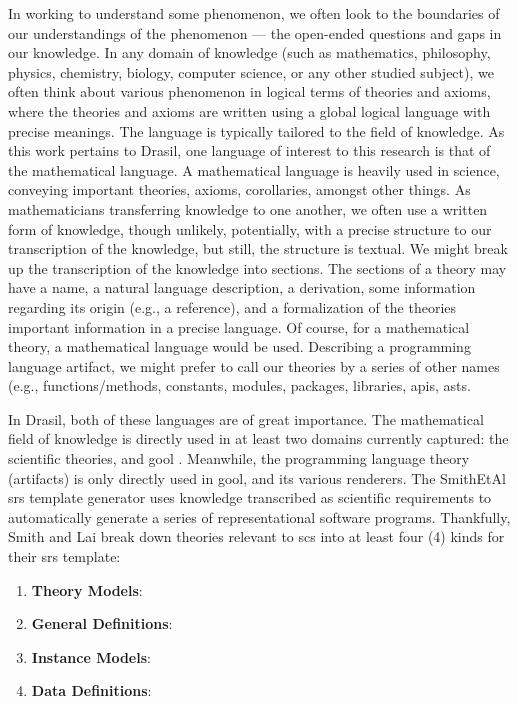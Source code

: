 
In working to understand some phenomenon, we often look to the boundaries of our
understandings of the phenomenon — the open-ended questions and gaps in our
knowledge. In any domain of knowledge (such as mathematics, philosophy, physics,
chemistry, biology, computer science, or any other studied subject), we often
think about various phenomenon in logical terms of theories and axioms, where
the theories and axioms are written using a global logical language with precise
meanings. The language is
typically tailored to the field of knowledge. As this work pertains to Drasil,
one language of interest to this research is that of the mathematical language.
A mathematical language is heavily used in science, conveying important
theories, axioms, corollaries, amongst other things. As mathematicians
transferring knowledge to one another, we often use a written form of knowledge,
though unlikely, potentially, with a precise structure to our transcription of
the knowledge, but still, the structure is textual. We might break up the
transcription of the knowledge into sections. The sections of a theory may have
a name, a natural language description, a derivation, some information regarding
its origin (e.g., a reference), and a formalization of the theories important
information in a precise language. Of course, for a mathematical theory, a
mathematical language would be used. Describing a programming language artifact,
we might prefer to call our theories by a series of other names (e.g.,
functions/methods, constants, modules, packages, libraries, \acsp{api},
\acsp{ast}.

In Drasil, both of these languages are of great importance. The mathematical
field of knowledge is directly used in at least two domains currently captured:
the scientific theories, and \acs{gool} \cite{Carette2019}. Meanwhile, the
programming language theory (artifacts) is only directly used in \acs{gool}, and
its various renderers. The SmithEtAl \acs{srs} \cite{SmithAndLai2005} template
generator uses knowledge transcribed as scientific requirements to automatically
generate a series of representational software programs. Thankfully, Smith and
Lai \cite{SmithAndLai2005} break down theories relevant to \acs{scs} into at
least four (4) kinds for their \acs{srs} template:

\begin{enumerate}

	\item \textbf{Theory Models}:

	\item \textbf{General Definitions}:

	\item \textbf{Instance Models}:

	\item \textbf{Data Definitions}:

\end{enumerate}

